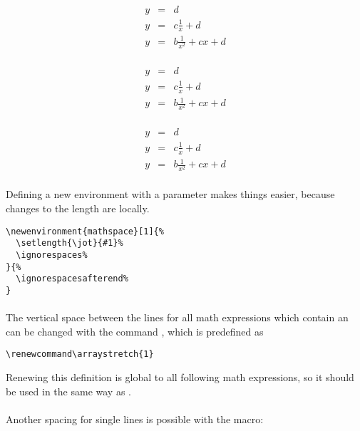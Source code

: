\begin{table}[htb]
\begin{minipage}{0.3\linewidth}
\begin{eqnarray*}
	y & = & d\\
	y & = & c\frac{1}{x}+d\\
	y & = & b\frac{1}{x^{2}}+cx+d\\
\end{eqnarray*}
\end{minipage}\hfill
\begin{minipage}{0.3\linewidth}
\setlength\jot{0pt}
\begin{eqnarray*}
	y & = & d\\
	y & = & c\frac{1}{x}+d\\
	y & = & b\frac{1}{x^{2}}+cx+d\\
\end{eqnarray*}
\end{minipage}\hfill
\begin{minipage}{0.3\linewidth}
\setlength\jot{10pt}
\begin{eqnarray*}
	y & = & d\\
	y & = & c\frac{1}{x}+d\\
	y & = & b\frac{1}{x^{2}}+cx+d\\
\end{eqnarray*}
\end{minipage}

Defining a new environment with a parameter makes things easier, because changes to the
length are locally.
\begin{lstlisting}
\newenvironment{mathspace}[1]{%
  \setlength{\jot}{#1}%
  \ignorespaces%
}{%
  \ignorespacesafterend%
}
\end{lstlisting}

\paragraph{}
%
The vertical space between the lines for all math expressions which contain an
 can be changed with the command
, which is predefined
as
\begin{verbatim}
\renewcommand\arraystretch{1}
\end{verbatim}

Renewing this definition is global to all following math expressions, so it should be used
in the same way as .

\paragraph{}
Another spacing for single lines is possible with the  macro:


\end{table}
